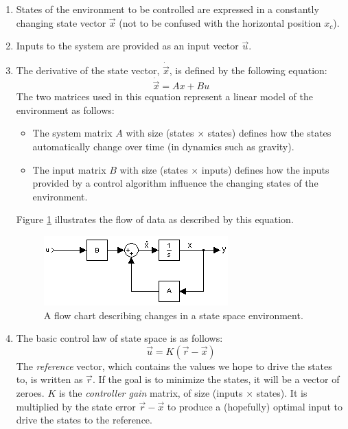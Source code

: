 \documentclass[12pt]{article}
\begin{document}
\begin{enumerate}
    \item States of the environment to be controlled are expressed in a constantly changing state vector $\vec{x}$ (not to be confused with the horizontal position $x _c$).
    \item Inputs to the system are provided as an input vector $\vec{u}$.
    \item The derivative of the state vector, $\dot{\vec{x}}$, is defined by the following equation:
        \begin{equation} \label{state_derivative}
            \dot{\vec{x}} = A x + B u
        \end{equation}
        The two matrices used in this equation represent a linear model of the environment as follows:
        \begin{itemize}
            \item The system matrix $A$ with size (states $\times$ states) defines how the states automatically change over time (in dynamics such as gravity).
            \item The input matrix $B$ with size (states $\times$ inputs) defines how the inputs provided by a control algorithm influence the changing states of the environment.
        \end{itemize}
        Figure \ref{state_space} illustrates the flow of data as described by this equation.
        \begin{figure}[ht]
            \centering
            \includegraphics[width=\textwidth]{state_space}
            \caption{\label{state_space} A flow chart describing changes in a state space environment.}
        \end{figure}
    \item The basic control law of state space is as follows:
        \begin{equation} \label{control_law}
            \vec{u} = K(\vec{r} - \vec{x})
        \end{equation}
        The \textit{reference} vector, which contains the values we hope to drive the states to, is written as $\vec{r}$. If the goal is to minimize the states, it will be a vector of zeroes. $K$ is the \textit{controller gain} matrix, of size (inputs $\times$ states). It is multiplied by the state error $\vec{r} - \vec{x}$ to produce a (hopefully) optimal input to drive the states to the reference.
\end{enumerate}
\end{document}
